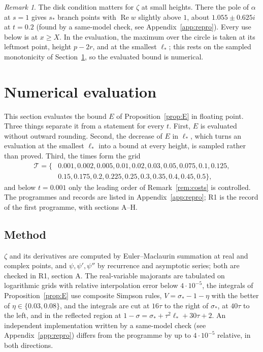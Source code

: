 \documentclass[11pt]{article}
\theoremstyle{definition}
\theoremstyle{remark}
\newtheorem{remark}[theorem]{Remark}
\newcommand{\re}{\operatorname{Re}}
\numberwithin{equation}{section}
\begin{document}
\begin{remark}\label{rem:branch}
The disk condition matters for $\zeta$ at small heights. There the pole of
$\alpha$ at $s=1$ gives $s_*$ branch points with $\re w$ slightly above
$1$, about $1.055\pm0.625i$ at $t=0.2$ (found by a same-model check, see
Appendix~\ref{app:repro}). Every use below is at $x\ge X$. In the
evaluation, the maximum over the circle is taken at its leftmost point,
height $p-2r$, and at the smallest $\ell_*$; this rests on the sampled
monotonicity of Section~\ref{sec:numerics}, so the evaluated bound is
numerical.
\end{remark}

\section{Numerical evaluation}\label{sec:numerics}

This section evaluates the bound $E$ of Proposition~\ref{prop:E} in floating
point. Three things separate it from a statement for every $t$. First, $E$
is evaluated without outward rounding. Second, the decrease of $E$ in
$\ell_*$, which turns an evaluation at the smallest $\ell_*$ into a bound at
every height, is sampled rather than proved. Third, the times form the
grid
\begin{align*}
\mathcal T=\{&0.001,0.002,0.005,0.01,0.02,0.03,0.05,0.075,0.1,0.125,\\
&0.15,0.175,0.2,0.225,0.25,0.3,0.35,0.4,0.45,0.5\},
\end{align*}
and below $t=0.001$ only the leading order of Remark~\ref{rem:costs} is
controlled. The programmes and records are listed in
Appendix~\ref{app:repro}; R1 is the record of the first programme, with
sections A--H.

\subsection{Method}

$\zeta$ and its derivatives are computed by Euler--Maclaurin summation at
real and complex points, and $\psi,\psi',\psi''$ by recurrence and
asymptotic series; both are checked in R1, section A. The real-variable
majorants are tabulated on logarithmic grids with relative interpolation
error below $4\cdot10^{-5}$, the integrals of Proposition~\ref{prop:E} use
composite Simpson rules, $V=\sigma_*-1-\eta$ with the better of
$\eta\in\{0.03,0.08\}$, and the integrals are cut at $16\tau$ to the right
of $\sigma_*$, at $40\tau$ to the left, and in the reflected region at
$1-\sigma=\sigma_*+\tau^2\ell_*+30\tau+2$. An
independent implementation written by a same-model check (see
Appendix~\ref{app:repro}) differs from the programme by up to
$4\cdot10^{-5}$ relative, in both directions.
\end{document}
